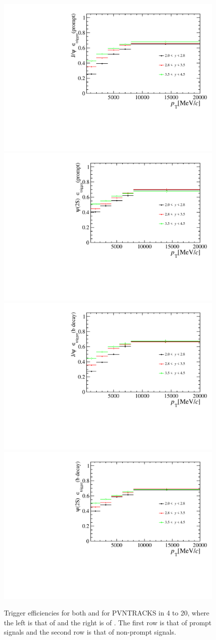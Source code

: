 \begin{figure}[!tbp]
  \begin{center}
    \includegraphics[width=0.49\linewidth]{pdf/Jpsi/eff_trigger/n1_eff_trigger_prompt_point.pdf}
    \includegraphics[width=0.49\linewidth]{pdf/Psi2S/eff_trigger/n1_eff_trigger_prompt_point.pdf}
    \vspace*{-0.5cm}
    \includegraphics[width=0.49\linewidth]{pdf/Jpsi/eff_trigger/n1_eff_trigger_fromb_point.pdf}
    \includegraphics[width=0.49\linewidth]{pdf/Psi2S/eff_trigger/n1_eff_trigger_fromb_point.pdf}
  \end{center}
  \caption{
    Trigger efficiencies for both \jpsi and \psitwos for PVNTRACKS in 4 to 20, where the 
    left is that of \jpsi and the right is of \psitwos. The first row is that of prompt signals and the 
    second row is that of non-prompt signals.}
  \label{EffTrigger}
\end{figure}
